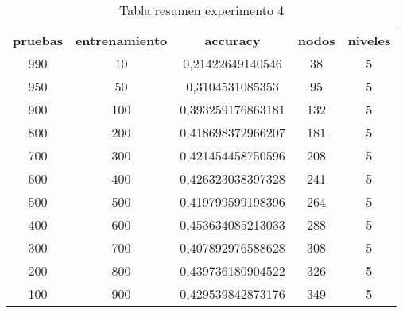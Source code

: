 \begin{table}[h]
	\centering
	\caption{Tabla resumen experimento 4}
	\label{my-label}
	\begin{tabular}{ccccc}
		\textbf{pruebas} & \textbf{entrenamiento} & \textbf{accuracy} & \textbf{nodos} & \textbf{niveles} \\
		990              & 10                     & 0,21422649140546  & 38             & 5                \\
		950              & 50                     & 0,3104531085353   & 95             & 5                \\
		900              & 100                    & 0,393259176863181 & 132            & 5                \\
		800              & 200                    & 0,418698372966207 & 181            & 5                \\
		700              & 300                    & 0,421454458750596 & 208            & 5                \\
		600              & 400                    & 0,426323038397328 & 241            & 5                \\
		500              & 500                    & 0,419799599198396 & 264            & 5                \\
		400              & 600                    & 0,453634085213033 & 288            & 5                \\
		300              & 700                    & 0,407892976588628 & 308            & 5                \\
		200              & 800                    & 0,439736180904522 & 326            & 5                \\
		100              & 900                    & 0,429539842873176 & 349            & 5               
	\end{tabular}
\end{table}

\begin{table}[]
	\centering

	\label{my-label}
	\caption{My caption}
\end{table}

